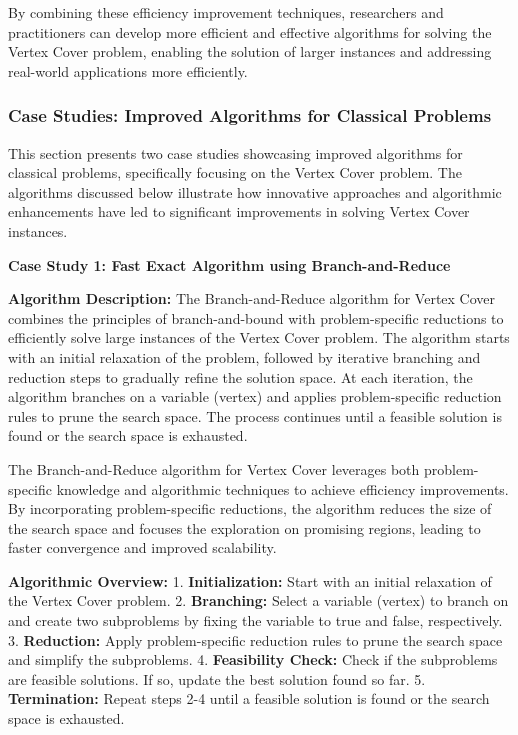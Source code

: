 \documentclass[12pt]{book} %
\begin{document}
By combining these efficiency improvement techniques, researchers and practitioners can develop more efficient and effective algorithms for solving the Vertex Cover problem, enabling the solution of larger instances and addressing real-world applications more efficiently.


\subsubsection{Case Studies: Improved Algorithms for Classical Problems}

This section presents two case studies showcasing improved algorithms for classical problems, specifically focusing on the Vertex Cover problem. The algorithms discussed below illustrate how innovative approaches and algorithmic enhancements have led to significant improvements in solving Vertex Cover instances.

\textbf{Case Study 1: Fast Exact Algorithm using Branch-and-Reduce}

\textbf{Algorithm Description:} The Branch-and-Reduce algorithm for Vertex Cover combines the principles of branch-and-bound with problem-specific reductions to efficiently solve large instances of the Vertex Cover problem. The algorithm starts with an initial relaxation of the problem, followed by iterative branching and reduction steps to gradually refine the solution space. At each iteration, the algorithm branches on a variable (vertex) and applies problem-specific reduction rules to prune the search space. The process continues until a feasible solution is found or the search space is exhausted.

The Branch-and-Reduce algorithm for Vertex Cover leverages both problem-specific knowledge and algorithmic techniques to achieve efficiency improvements. By incorporating problem-specific reductions, the algorithm reduces the size of the search space and focuses the exploration on promising regions, leading to faster convergence and improved scalability.

\textbf{Algorithmic Overview:} 
1. \textbf{Initialization:} Start with an initial relaxation of the Vertex Cover problem.
2. \textbf{Branching:} Select a variable (vertex) to branch on and create two subproblems by fixing the variable to true and false, respectively.
3. \textbf{Reduction:} Apply problem-specific reduction rules to prune the search space and simplify the subproblems.
4. \textbf{Feasibility Check:} Check if the subproblems are feasible solutions. If so, update the best solution found so far.
5. \textbf{Termination:} Repeat steps 2-4 until a feasible solution is found or the search space is exhausted.
\end{document}
